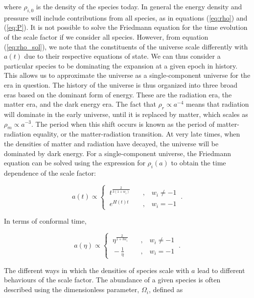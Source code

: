\documentclass[10pt,letterpaper,final]{iopart}
\numberwithin{equation}{subsection}
\def\ni{\noindent}
\begin{document}
\ni where $\rho_{i,0}$ is the density of the species today. In general the energy density and pressure will include contributions from all species, as in equations (\ref{eq:rho}) and (\ref{eq:P}). It is not possible to solve the Friedmann equation for the time evolution of the scale factor if we consider all species. However, from equation (\ref{eq:rho_sol}), we note that the constituents of the universe scale differently with $a(t)$ due to their respective equations of state. We can thus consider a particular species to be dominating the expansion at a given epoch in history. This allows us to approximate the universe as a single-component universe for the era in question. The history of the universe is thus organized into three broad eras based on the dominant form of energy. These are the radiation era, the matter era, and the dark energy era. The fact that $\rho_r \propto a^{-4}$ means that radiation will dominate in the early universe, until it is replaced by matter, which scales as $\rho_m \propto a^{-3}$. The period when this shift occurs is known as the period of matter-radiation equality, or the matter-radiation transition. At very late times, when the densities of matter and radiation have decayed, the universe will be dominated by dark energy. For a single-component universe, the Friedmann equation can be solved using the expression for $\rho_i(a)$ to obtain the time dependence of the scale factor:

\begin{equation}
a(t) \propto \begin{cases} \ t^{\frac{2}{3\left(1+w_i\right)}} &\quad \text{,} \quad w_i \neq -1  \\  \ e^{H(t)t}  &\quad \text{,} \quad  w_i = -1 \end{cases} \ .
\end{equation}

\ni In terms of conformal time,

\begin{equation}
a(\eta) \propto \begin{cases} \ \eta^{\frac{2}{1+3w_i}} &\quad \text{,} \quad w_i \neq -1  \\  \ - \frac{1}{\eta}  &\quad \text{,} \quad  w_i = -1 \end{cases} \ .
\end{equation}

\ni The different ways in which the densities of species scale with $a$ lead to different behaviours of the scale factor. The abundance of a given species is often described using the dimensionless parameter, $\Omega_i$, defined as
\end{document}
